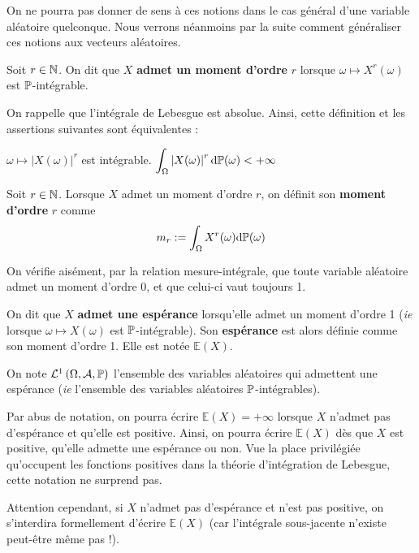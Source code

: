 \documentclass[../integ-proba.tex]{subfiles}
\begin{document}
    On ne pourra pas donner de sens à ces notions dans le cas général d'une variable aléatoire quelconque.
    Nous verrons néanmoins par la suite comment généraliser ces notions aux vecteurs aléatoires.

    \begin{defi}
        Soit $r\in\mathbb{N}$.
        On dit que $X$ \textbf{admet un moment d'ordre} $r$ lorsque $\omega \mapsto X^r(\omega)$ est $\mathbb{P}$-intégrable.
    \end{defi}

    \begin{rem}
        On rappelle que l'intégrale de Lebesgue est absolue.
        Ainsi, cette définition et les assertions suivantes sont équivalentes :
        \begin{itemize}
            \itemb $\omega \mapsto \left|X(\omega)\right|^r$ est intégrable.
            \itemb $\displaystyle \int_\Omega\left|X(\omega)\right|^r\text{d}\mathbb{P}(\omega) < +\infty$
        \end{itemize}
    \end{rem}

    \begin{defi}
        Soit $r\in\mathbb{N}$.
        Lorsque $X$ admet un moment d'ordre $r$, on définit son \textbf{moment d'ordre } $r$ comme
        \begin{displaymath}
          m_r := \int_\Omega X^r(\omega)\text{d}\mathbb{P}(\omega)
        \end{displaymath}
    \end{defi}

    \begin{rem}
        On vérifie aisément, par la relation mesure-intégrale, que toute variable aléatoire admet un moment d'ordre 0, et que celui-ci vaut toujours 1.
    \end{rem}

    \begin{defi}
        On dit que $X$ \textbf{admet une espérance} lorsqu'elle admet un moment d'ordre 1 (\textit{ie} lorsque $\omega \mapsto X\left(\omega\right)$ est $\mathbb{P}$-intégrable).
        Son \textbf{espérance} est alors définie comme son moment d'ordre 1.
        Elle est notée $\mathbb{E}(X)$.

        On note $\mathcal{L}^1\left(\Omega, \mathcal{A}, \mathbb{P}\right)$ l'ensemble des variables aléatoires qui admettent une espérance (\textit{ie} l'ensemble des variables aléatoires $\mathbb{P}$-intégrables).
    \end{defi}

    \begin{rem}
        Par abus de notation, on pourra écrire $\mathbb{E}(X)=+\infty$ lorsque $X$ n'admet pas d'espérance et qu'elle est positive.
        Ainsi, on pourra écrire $\mathbb{E}(X)$ dès que $X$ est positive, qu'elle admette une espérance ou non.
        Vue la place privilégiée qu'occupent les fonctions positives dans la théorie d'intégration de Lebesgue, cette notation ne surprend pas.

        Attention cependant, si $X$ n'admet pas d'espérance et n'est pas positive, on s'interdira formellement d'écrire $\mathbb{E}(X)$ (car l'intégrale sous-jacente n'existe peut-être même pas !).
    \end{rem}
\end{document}
